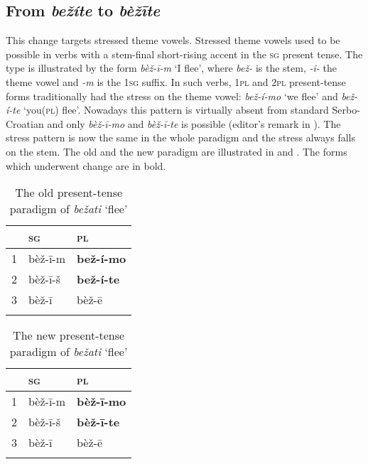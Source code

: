 \documentclass[output=paper,modfonts,nonflat
]{langsci/langscibook}
\begin{document}
\subsection{From \textit{bežíte} to \textit{bèžīte}} \label{sec:kager:subsec22}
This change targets stressed theme vowels. Stressed theme vowels used to be possible in verbs with a stem-final short-rising accent in the \textsc{sg}  present tense. The type is illustrated by the form \textit{bèž-ī-m} `I flee', where \textit{bež-} is the stem, \textit{-i-} the theme vowel and \textit{-m} is the 1\textsc{sg} suffix. In such verbs, 1\textsc{pl} and 2\textsc{pl} present-tense forms traditionally had the stress on the theme vowel: \textit{bež-í-mo} `we flee' and \textit{bež-í-te} `you(\textsc{pl}) flee'. Nowadays this pattern is virtually absent from standard Serbo-Croatian and only \textit{bèž-ī-mo} and \textit{bèž-ī-te} is possible (editor's remark in \citealt[379]{Klaic2013}). The stress pattern is now the same in the whole paradigm and the stress always falls on the stem. The old and the new paradigm are illustrated in  and .  The forms which underwent change are in bold.

\begin{table}
\caption{The old present-tense paradigm of \textit{bežati} `flee'}
\label{tab:kager:2}
 \begin{tabular}{  l l l }
  \lsptoprule
& \textsc{sg} & \textsc{pl}\\ 
  \midrule
  1  &   bèž-ī-m  &   \textbf{bež-í-mo}\\
  2  &  bèž-ī-š & \textbf{bež-í-te}\\
3  &  bèž-ī & bèž-ē\\
  \lspbottomrule
 \end{tabular}
\end{table}


\begin{table}
\caption{The new present-tense paradigm of \textit{bežati} `flee'}
\label{tab:kager:3}
 \begin{tabular}{  l l l }
  \lsptoprule
& \textsc{sg} & \textsc{pl}\\ 
  \midrule
  1  &   bèž-ī-m  &   \textbf{bèž-ī-mo}\\
  2  &  bèž-ī-š & \textbf{bèž-ī-te}\\
3  &  bèž-ī & bèž-ē\\
  \lspbottomrule
 \end{tabular}
\end{table}
\end{document}
